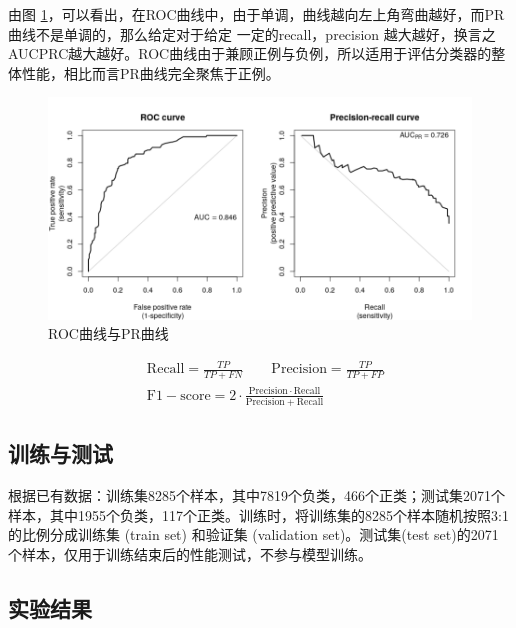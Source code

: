 \documentclass[a4paper]{article}
\begin{document}
由图 \ref{fig:roc2}，可以看出，在ROC曲线中，由于单调，曲线越向左上角弯曲越好，而PR曲线不是单调的，那么给定对于给定 一定的recall，precision 越大越好，换言之AUCPRC越大越好。ROC曲线由于兼顾正例与负例，所以适用于评估分类器的整体性能，相比而言PR曲线完全聚焦于正例。

\begin{figure}[!h]
    \centering
    \includegraphics[width=0.8\linewidth]{roc_pr-1.png}
    \caption{ROC曲线与PR曲线}
    \label{fig:roc2}
\end{figure}

\begin{align*}
& \mathrm{Recall} = \frac{TP}{TP+FN} \qquad \mathrm{Precision} = \frac{TP}{TP+FP} \\
& \mathrm{F1-score} = 2 \cdot \frac{\mathrm{Precision}  \cdot \mathrm{Recall}}{\mathrm{Precision} + \mathrm{Recall}}
\end{align*}




\subsection{训练与测试}
根据已有数据：训练集8285个样本，其中7819个负类，466个正类；测试集2071个样本，其中1955个负类，117个正类。训练时，将训练集的8285个样本随机按照3:1的比例分成训练集 (train set) 和验证集 (validation set)。测试集(test set)的2071个样本，仅用于训练结束后的性能测试，不参与模型训练。

\subsection{实验结果}
\end{document}
